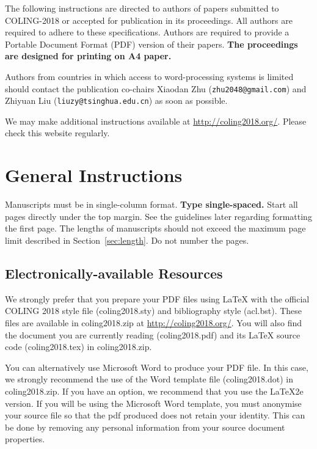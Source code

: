 The following instructions are directed to authors of papers submitted
to COLING-2018 or accepted for publication in its proceedings. All
authors are required to adhere to these specifications. Authors are
required to provide a Portable Document Format (PDF) version of their
papers. \textbf{The proceedings are designed for printing on A4
  paper.}

Authors from countries in which access to word-processing systems is
limited should contact the publication co-chairs
Xiaodan Zhu
(\texttt{zhu2048@gmail.com}) and Zhiyuan Liu (\texttt{liuzy@tsinghua.edu.cn})
as soon as possible.

We may make additional instructions available at \url{http://coling2018.org/}. Please check
this website regularly.


\section{General Instructions}

Manuscripts must be in single-column format. {\bf Type single-spaced.}  Start all
pages directly under the top margin. See the guidelines later
regarding formatting the first page. The lengths of manuscripts
should not exceed the maximum page limit described in Section~\ref{sec:length}.
Do not number the pages.


\subsection{Electronically-available Resources}

We strongly prefer that you prepare your PDF files using \LaTeX{} with
the official COLING 2018 style file (coling2018.sty) and bibliography style
(acl.bst). These files are available in coling2018.zip 
at \url{http://coling2018.org/}.
You will also find the document
you are currently reading (coling2018.pdf) and its \LaTeX{} source code
(coling2018.tex) in coling2018.zip. 

You can alternatively use Microsoft Word to produce your PDF file. In
this case, we strongly recommend the use of the Word template file
(coling2018.dot) in coling2018.zip. If you have an option, we
recommend that you use the \LaTeX2e{} version. If you will be
  using the Microsoft Word template, you must anonymise
  your source file so that the pdf produced does not retain your
  identity.  This can be done by removing any personal information
from your source document properties.




